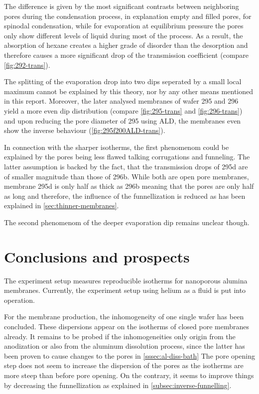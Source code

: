\documentclass[../thesis.tex]{subfiles}
\begin{document}
              The difference is given by the most significant contrasts between neighboring pores during the condensation process, in explanation empty and filled pores, for spinodal condensation, while for evaporation at equilibrium pressure the pores only show different levels of liquid during most of the process. As a result, the absorption of hexane creates a higher grade of disorder than the desorption and therefore causes a more significant drop of the transmission coefficient (compare \cref{fig:292-trans}).
              \medskip

              The splitting of the evaporation drop into two dips seperated by a small local maximum cannot be explained by this theory, nor by any other means mentioned in this report. Moreover, the later analysed membranes of wafer 295 and 296 yield a more even dip distribution (compare \cref{fig:295-trans} and \cref{fig:296-trans}) and upon reducing the pore diameter of 295 using ALD, the membranes even show the inverse behaviour (\cref{fig:295f200ALD-trans}).

              In connection with the sharper isotherms, the first phenomenom could be explained by the pores being less flawed talking corrugations and funneling. The latter assumption is backed by the fact, that the transmission drops of 295d are of smaller magnitude than those of 296b. While both are open pore membranes, membrane 295d is only half as thick as 296b meaning that the pores are only half as long and therefore, the influence of the funnellization is reduced as has been explained in \cref{sec:thinner-membranes}.

              The second phenomenom of the deeper evaporation dip remains unclear though.

              


  \section{Conclusions and prospects}

    The experiment setup measures reproducible isotherms for nanoporous alumina membranes. Currently, the experiment setup using helium as a fluid is put into operation.

    For the membrane production, the inhomogeneity of one single wafer has been concluded. These dispersions appear on the isotherms of closed pore membranes already. It remains to be probed if the inhomogeneities only origin from the anodization or also from the aluminum dissolution process, since the latter has been proven to cause changes to the pores in \cref{sssec:al-diss-bath} The pore opening step does not seem to increase the dispersion of the pores as the isotherms are more steep than before pore opening. On the contrary, it seems to improve things by decreasing the funnellization as explained in \cref{subsec:inverse-funnelling}.
\end{document}
